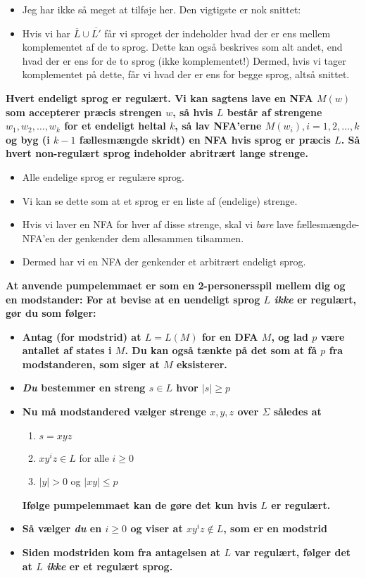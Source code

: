 \begin{itemize}
  \item Jeg har ikke så meget at tilføje her. Den vigtigste er nok snittet:
  \item Hvis vi har $\overline{L} \cup \overline{L'}$ får vi sproget der indeholder hvad der er ens mellem komplementet af de to sprog. Dette kan også beskrives som alt andet, end hvad der er ens for de to sprog (ikke komplementet!) Dermed, hvis vi tager komplementet på dette, får vi hvad der er ens for begge sprog, altså snittet.
\end{itemize}
\noindent
\textbf{Hvert endeligt sprog er regulært. Vi kan sagtens lave en NFA $M(w)$ som accepterer præcis strengen $w$, så hvis $L$ består af strengene $w_{1}, w_{2}, \ldots, w_{k}$ for et endeligt heltal $k$, så lav NFA'erne $M(w_{i}), i = 1, 2, \ldots, k$ og byg (i $k-1$ fællesmængde skridt) en NFA hvis sprog er præcis $L$. Så hvert non-regulært sprog indeholder abritrært lange strenge.}
\begin{itemize}
  \item Alle endelige sprog er regulære sprog.
  \item Vi kan se dette som at et sprog er en liste af (endelige) strenge.
  \item Hvis vi laver en NFA for hver af disse strenge, skal vi \textit{bare} lave fællesmængde-NFA'en der genkender dem allesammen tilsammen.
  \item Dermed har vi en NFA der genkender et arbitrært endeligt sprog.
\end{itemize}

\noindent
\textbf{At anvende pumpelemmaet er som en 2-personersspil mellem dig og en modstander: For at bevise at en uendeligt sprog $L$ \textit{ikke} er regulært, gør du som følger:}

\begin{itemize}
  \item \textbf{Antag (for modstrid) at $L = L(M)$ for en DFA $M$, og lad $p$ være antallet af states i $M$. Du kan også tænkte på det som at få $p$ fra modstanderen, som siger at $M$ eksisterer. }
  \item \textbf{\textit{Du} bestemmer en streng $s \in L$ hvor $|s| \geq p$}
  \item \textbf{Nu må modstandered vælger strenge $x,y,z$ over $\Sigma$ således at}
        \begin{enumerate}
          \item $s = xyz$
          \item $xy^{i}z \in L$ for alle $i \geq 0$
          \item $|y| > 0$ og $|xy| \leq p$
        \end{enumerate}
        \textbf{Ifølge pumpelemmaet kan de gøre det kun hvis $L$ er regulært.}
  \item \textbf{Så vælger \textit{du} en $i \geq 0$ og viser at $xy^{i}z \notin L$, som er en modstrid}
        \item \textbf{Siden modstriden kom fra antagelsen at $L$ var regulært, følger det at $L$ \textit{ikke} er et regulært sprog.}
\end{itemize}

